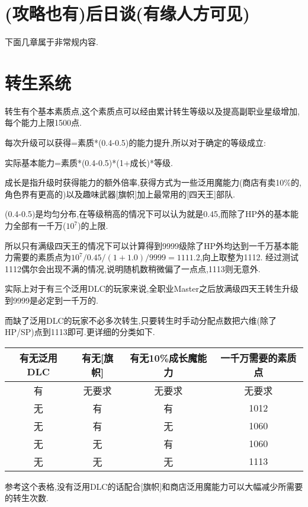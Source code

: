 	\section{(攻略也有)后日谈(有缘人方可见)}

	下面几章属于非常规内容.
	
	\newpage
	
	\section{转生系统}

	转生有个基本素质点,这个素质点可以经由累计转生等级以及提高副职业星级增加,每个能力上限1500点.

	每次升级可以获得=素质*(0.4-0.5)的能力提升,所以对于确定的等级成立:

	实际基本能力=素质*(0.4-0.5)*(1+成长)*等级.

	成长是指升级时获得能力的额外倍率,获得方式为一些泛用魔能力(商店有卖10\%的,角色界有更高的)以及趣味武器[旗帜]加上最常用的[四天王]部队.

	(0.4-0.5)是均匀分布,在等级稍高的情况下可以认为就是0.45,而除了HP外的基本能力全部有一千万($10^7$)的上限.

	所以只有满级四天王的情况下可以计算得到9999级除了HP外均达到一千万基本能力需要的素质点为$10^7/0.45/(1+1.0)/9999=1111.2$,向上取整为1112.
经过测试1112偶尔会出现不满的情况,说明随机数稍微偏了一点点,1113则无意外.

	实际上对于有三个泛用DLC的玩家来说,全职业Master之后放满级四天王转生升级到9999是必定到一千万的.

	而缺了泛用DLC的玩家不必多次转生,只要转生时手动分配点数把六维(除了HP/SP)点到1113即可.更详细的分类如下.



	\begin{center}
		\begin{tabular}
		{| c | c | c | c |}
		\hline
		有无泛用DLC & 有无[旗帜] & 有无10\%成长魔能力 & 一千万需要的素质点\\
		\hline
		有 & 无要求 & 无要求 & 无要求\\
		\hline
		无 & 有 & 有 & 1012\\
		\hline
		无 & 有 & 无 & 1060\\
		\hline
		无 & 无 & 有 & 1060\\
		\hline
		无 & 无 & 无 & 1113\\
		\hline
		\end{tabular}
	\end{center}

	参考这个表格,没有泛用DLC的话配合[旗帜]和商店泛用魔能力可以大幅减少所需要的转生次数.

